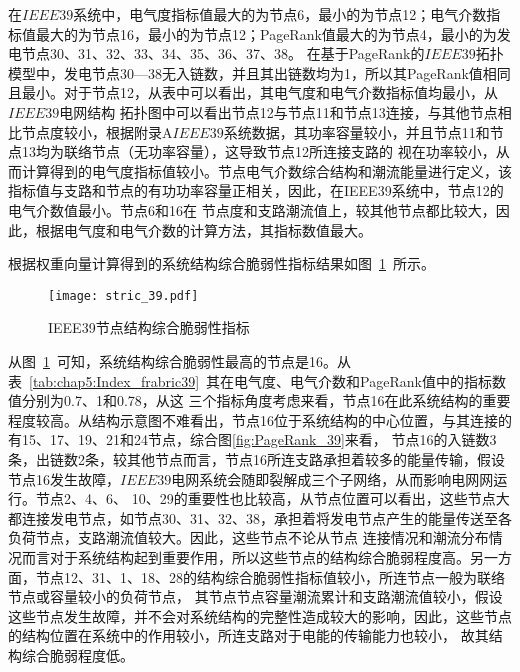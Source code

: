 在$IEEE39$系统中，电气度指标值最大的为节点6，最小的为节点12；电气介数指标值最大的为节点16，最小的为节点12；PageRank值最大的为节点4，最小的为发电节点30、31、32、33、34、35、36、37、38。
在基于PageRank的$IEEE39$拓扑模型中，发电节点30—38无入链数，并且其出链数均为1，所以其PageRank值相同且最小。对于节点12，从表中可以看出，其电气度和电气介数指标值均最小，从$IEEE39$电网结构
拓扑图中可以看出节点12与节点11和节点13连接，与其他节点相比节点度较小，根据附录A$IEEE39$系统数据，其功率容量较小，并且节点11和节点13均为联络节点（无功率容量），这导致节点12所连接支路的
视在功率较小，从而计算得到的电气度指标值较小。节点电气介数综合结构和潮流能量进行定义，该指标值与支路和节点的有功功率容量正相关，因此，在IEEE39系统中，节点12的电气介数值最小。节点6和16在
节点度和支路潮流值上，较其他节点都比较大，因此，根据电气度和电气介数的计算方法，其指标数值最大。

根据权重向量计算得到的系统结构综合脆弱性指标结果如图~\ref{fig:stric_39}~所示。
\begin{figure}[H] %
  \centering
  \texttt{[image: stric\_39.pdf]}
  \caption{IEEE39节点结构综合脆弱性指标}
  \label{fig:stric_39}
\end{figure}

从图~\ref{fig:stric_39}~可知，系统结构综合脆弱性最高的节点是16。从表~\ref{tab:chap5:Index_frabric39}~其在电气度、电气介数和PageRank值中的指标数值分别为0.7、1和0.78，从这
三个指标角度考虑来看，节点16在此系统结构的重要程度较高。从结构示意图不难看出，节点16位于系统结构的中心位置，与其连接的有15、17、19、21和24节点，综合图\ref{fig:PageRank_39}来看，
节点16的入链数3条，出链数2条，较其他节点而言，节点16所连支路承担着较多的能量传输，假设节点16发生故障，$IEEE39$电网系统会随即裂解成三个子网络，从而影响电网网运行。节点2、4、6、
10、29的重要性也比较高，从节点位置可以看出，这些节点大都连接发电节点，如节点30、31、32、38，承担着将发电节点产生的能量传送至各负荷节点，支路潮流值较大。因此，这些节点不论从节点
连接情况和潮流分布情况而言对于系统结构起到重要作用，所以这些节点的结构综合脆弱程度高。另一方面，节点12、31、1、18、28的结构综合脆弱性指标值较小，所连节点一般为联络节点或容量较小的负荷节点，
其节点节点容量潮流累计和支路潮流值较小，假设这些节点发生故障，并不会对系统结构的完整性造成较大的影响，因此，这些节点的结构位置在系统中的作用较小，所连支路对于电能的传输能力也较小，
故其结构综合脆弱程度低。

